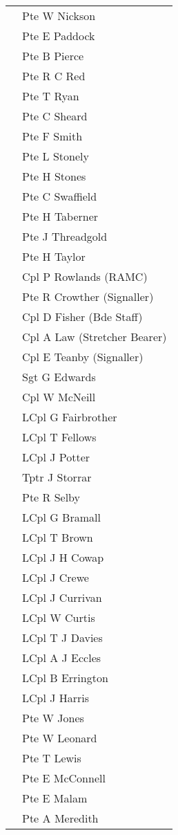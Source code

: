 \begin{center}
\begin{tabular}{rl}
    & Pte W Nickson \\
    & Pte E Paddock \\
    & Pte B Pierce \\
    & Pte R C Red \\
    & Pte T Ryan \\
    & Pte C Sheard \\
    & Pte F Smith \\
    & Pte L Stonely \\
    & Pte H Stones \\
    & Pte C Swaffield \\
    & Pte H Taberner \\
    & Pte J Threadgold \\
    & Pte H Taylor \\
    & Cpl P Rowlands (RAMC) \\
    & Pte R Crowther (Signaller) \\
    & Cpl D Fisher (Bde Staff) \\
    & Cpl A Law (Stretcher Bearer) \\
    & Cpl E Teanby (Signaller) \\
    & Sgt G Edwards \\
    & Cpl W McNeill \\
    & LCpl G Fairbrother \\
    & LCpl T Fellows \\
    & LCpl J Potter \\
    & Tptr J Storrar \\
    & Pte R Selby \\
    & LCpl G Bramall \\
    & LCpl T Brown \\
    & LCpl J H Cowap \\
    & LCpl J Crewe \\
    & LCpl J Currivan \\
    & LCpl W Curtis \\
    & LCpl T J Davies \\
    & LCpl A J Eccles \\
    & LCpl B Errington \\
    & LCpl J Harris \\
    & Pte W Jones \\
    & Pte W Leonard \\
    & Pte T Lewis \\
    & Pte E McConnell \\
    & Pte E Malam \\
    & Pte A Meredith \\

\end{tabular}
\end{center}
